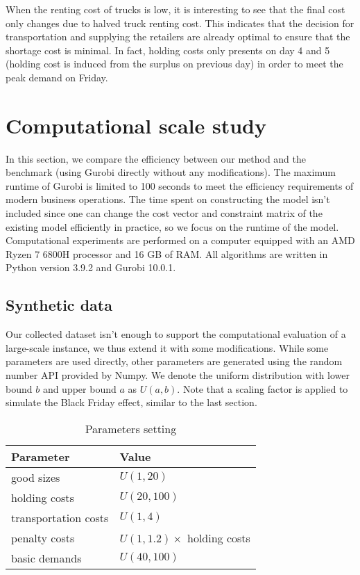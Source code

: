 \documentclass[a4paper,12pt]{article}
\begin{document}
When the renting cost of trucks is low, it is interesting to see that the final cost only changes due to halved truck renting cost.
This indicates that the decision for transportation and supplying the retailers are already optimal to ensure that the shortage cost is minimal. In fact, holding costs only presents on day 4 and 5 (holding cost is induced from the surplus on previous day) in order to meet the peak demand on Friday.






\section{Computational scale study}\label{sec:computational-scale-study}
In this section, we compare the efficiency between our method and the benchmark (using Gurobi directly without any modifications).
The maximum runtime of Gurobi is limited to 100 seconds to meet the efficiency requirements of modern business operations.
The time spent on constructing the model isn't included since one can change the cost vector and constraint matrix of the existing model efficiently in practice, so we focus on the runtime of the model.
Computational experiments are performed on a computer equipped with an AMD Ryzen 7 6800H processor and 16 GB of RAM.
All algorithms are written in Python version 3.9.2 and Gurobi 10.0.1.

\subsection{Synthetic data}\label{subsec:synthetic-data}

Our collected dataset isn't enough to support the computational evaluation of a large-scale instance, we thus extend it with some modifications.
While some parameters are used directly, other parameters are generated using the random number API provided by Numpy.
We denote the uniform distribution with lower bound $b$ and upper bound $a$ as $U(a, b)$.
Note that a scaling factor is applied to simulate the Black Friday effect, similar to the last section.

\begin{table}[htbp]
    \centering
    \caption{Parameters setting}
    \label{tab:example}
    \begin{tabular}{ll}
        \toprule
        Parameter & Value \\
        \midrule
        good sizes & $U(1, 20)$ \\
        holding costs   & $U(20, 100)$  \\
        transportation costs   & $U(1, 4)$  \\
        penalty costs   & $U(1, 1.2) \times$ holding costs  \\
        basic demands         & $U(40, 100)$ \\
        \bottomrule
    \end{tabular}
\end{table}
\end{document}
